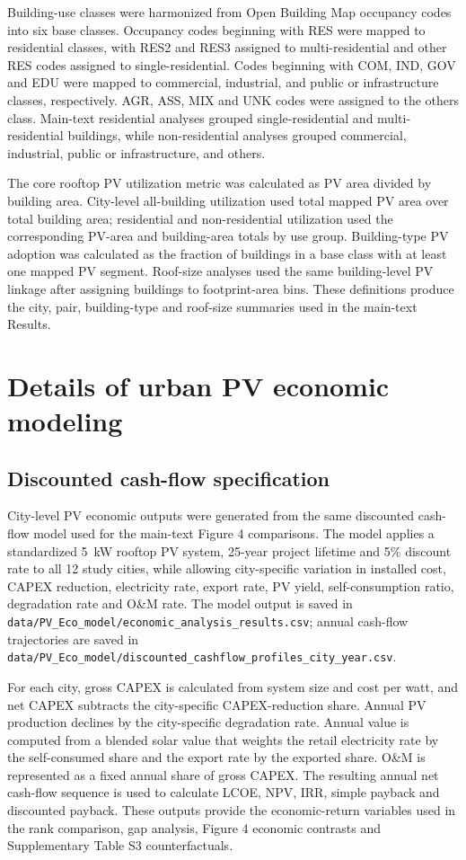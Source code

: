 \documentclass[pdflatex,sn-nature]{sn-jnl}
\begin{document}
Building-use classes were harmonized from Open Building Map occupancy codes into six base classes. Occupancy codes beginning with RES were mapped to residential classes, with RES2 and RES3 assigned to multi-residential and other RES codes assigned to single-residential. Codes beginning with COM, IND, GOV and EDU were mapped to commercial, industrial, and public or infrastructure classes, respectively. AGR, ASS, MIX and UNK codes were assigned to the others class. Main-text residential analyses grouped single-residential and multi-residential buildings, while non-residential analyses grouped commercial, industrial, public or infrastructure, and others.

The core rooftop PV utilization metric was calculated as PV area divided by building area. City-level all-building utilization used total mapped PV area over total building area; residential and non-residential utilization used the corresponding PV-area and building-area totals by use group. Building-type PV adoption was calculated as the fraction of buildings in a base class with at least one mapped PV segment. Roof-size analyses used the same building-level PV linkage after assigning buildings to footprint-area bins. These definitions produce the city, pair, building-type and roof-size summaries used in the main-text Results.

\section{Details of urban PV economic modeling}

\subsection{Discounted cash-flow specification}

City-level PV economic outputs were generated from the same discounted cash-flow model used for the main-text Figure 4 comparisons. The model applies a standardized 5~kW rooftop PV system, 25-year project lifetime and 5\% discount rate to all 12 study cities, while allowing city-specific variation in installed cost, CAPEX reduction, electricity rate, export rate, PV yield, self-consumption ratio, degradation rate and O\&M rate. The model output is saved in \texttt{data/PV\_Eco\_model/economic\_analysis\_results.csv}; annual cash-flow trajectories are saved in \texttt{data/PV\_Eco\_model/discounted\_cashflow\_profiles\_city\_year.csv}.

For each city, gross CAPEX is calculated from system size and cost per watt, and net CAPEX subtracts the city-specific CAPEX-reduction share. Annual PV production declines by the city-specific degradation rate. Annual value is computed from a blended solar value that weights the retail electricity rate by the self-consumed share and the export rate by the exported share. O\&M is represented as a fixed annual share of gross CAPEX. The resulting annual net cash-flow sequence is used to calculate LCOE, NPV, IRR, simple payback and discounted payback. These outputs provide the economic-return variables used in the rank comparison, gap analysis, Figure 4 economic contrasts and Supplementary Table S3 counterfactuals.
\end{document}
